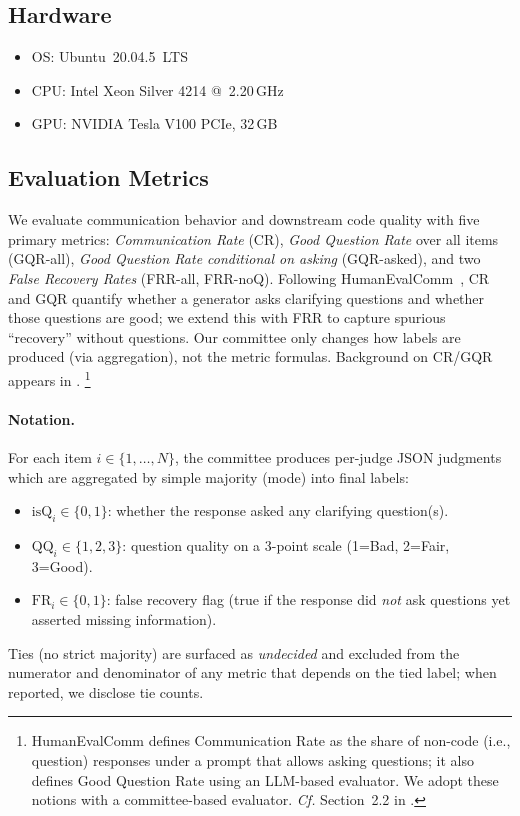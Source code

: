 \documentclass[acmsmall,screen,nonacm]{acmart}
\begin{document}
\subsection{Hardware}
\begin{itemize}[leftmargin=*,nosep]
  \item OS: Ubuntu~20.04.5~LTS
  \item CPU: Intel\textsuperscript{\textregistered} Xeon\textsuperscript{\textregistered} Silver 4214 @~2.20\,GHz
  \item GPU: NVIDIA Tesla V100 PCIe, 32\,GB
\end{itemize}

\subsection{Evaluation Metrics}
\label{sec:metrics}
We evaluate communication behavior and downstream code quality with five primary metrics: \emph{Communication Rate} (CR), \emph{Good Question Rate} over all items (GQR-all), \emph{Good Question Rate conditional on asking} (GQR-asked), and two \emph{False Recovery Rates} (FRR-all, FRR-noQ). Following HumanEvalComm~\cite{WuFard2025HumanEvalComm}, CR and GQR quantify whether a generator asks clarifying questions and whether those questions are good; we extend this with FRR to capture spurious ``recovery'' without questions. Our committee only changes how labels are produced (via aggregation), not the metric formulas. Background on CR/GQR appears in \citet{WuFard2025HumanEvalComm}.%
\footnote{HumanEvalComm defines Communication Rate as the share of non-code (i.e., question) responses under a prompt that allows asking questions; it also defines Good Question Rate using an LLM-based evaluator. We adopt these notions with a committee-based evaluator. \emph{Cf.} Section~2.2 in \citet{WuFard2025HumanEvalComm}.}

\paragraph{Notation.}
For each item $i\in\{1,\dots,N\}$, the committee produces per-judge JSON judgments which are aggregated by simple majority (mode) into final labels:
\begin{itemize}[leftmargin=1.1em, itemsep=0.2em]
  \item $\mathrm{isQ}_i \in \{0,1\}$: whether the response asked any clarifying question(s).
  \item $\mathrm{QQ}_i \in \{1,2,3\}$: question quality on a 3-point scale (1=Bad, 2=Fair, 3=Good).
  \item $\mathrm{FR}_i \in \{0,1\}$: false recovery flag (true if the response did \emph{not} ask questions yet asserted missing information).
\end{itemize}
Ties (no strict majority) are surfaced as \emph{undecided} and excluded from the numerator and denominator of any metric that depends on the tied label; when reported, we disclose tie counts.
\end{document}
